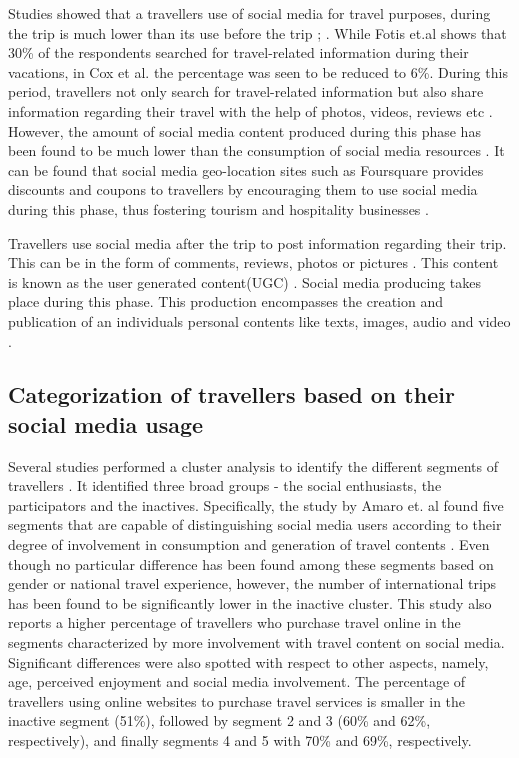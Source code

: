 Studies showed that a traveller\textquotesingle s use of social media for travel purposes, during the trip is much lower than its use before the trip \cite{cox2009role}; \cite{fotis2012social}. While Fotis et.al shows that 30\% of the respondents searched for travel-related information during their vacations, in Cox et al. the percentage was seen to be reduced to 6\%\cite{fotis2012social}\cite{cox2009role}. During this period, travellers not only search for travel-related information but also share information regarding their travel with the help of photos, videos, reviews etc \cite{amaro2016travelers}. However, the amount of social media content produced during this phase has been found to be much lower than the consumption of social media resources \cite{fotis2012social}. It can be found that social media geo-location sites such as Foursquare provides discounts and coupons to travellers by encouraging them to use social media during this phase, thus fostering tourism and hospitality businesses \cite{hudson2013impact}.

Travellers use social media after the trip to post information regarding their trip. This can be in the form of comments, reviews, photos or pictures \cite{fotis2012social}\cite{parra2012travellers}. This content is known as the user generated content(UGC) \cite{simms2012online}. Social media producing takes place during this phase. This production encompasses the creation and publication of an individual\textquotesingle s personal contents like texts, images, audio and video \cite{shao2009understanding}. 


\subsection{Categorization of travellers based on their social media usage}\label{2.3}

Several studies performed a cluster analysis to identify the different segments of travellers\cite{chiu2012china}\cite{foster2011exploring}\cite{kurtulucs2015social} . It identified three broad groups - the social enthusiasts, the participators and the inactives. Specifically, the study by Amaro et. al found five segments that are capable of distinguishing social media users according to their degree of involvement in consumption and generation of travel contents \cite{amaro2016travelers}. Even though no particular difference has been found among these segments based on gender or national travel experience, however, the number of international trips has been found to be significantly lower in the inactive cluster. This study also reports a higher percentage of travellers who purchase travel online in the segments characterized by more involvement with travel content on social media. Significant differences were also spotted with respect to other aspects, namely, age, perceived enjoyment and social media involvement. 	The percentage of travellers using online websites to purchase travel services is smaller in the inactive segment (51\%), followed by segment 2 and 3 (60\% and 62\%, respectively), and finally segments 4 and 5 with 70\% and 69\%, respectively.

